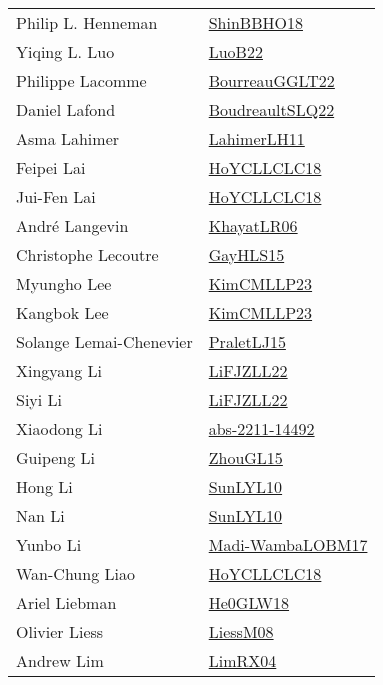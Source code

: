 {\begin{longtable}{p{4cm}p{20cm}}
Philip L. Henneman & \href{articles/ShinBBHO18.pdf}{ShinBBHO18}\cite{ShinBBHO18} \\
Yiqing L. Luo & \href{papers/LuoB22.pdf}{LuoB22}\cite{LuoB22} \\
Philippe Lacomme & \href{articles/BourreauGGLT22.pdf}{BourreauGGLT22}\cite{BourreauGGLT22} \\
Daniel Lafond & \href{papers/BoudreaultSLQ22.pdf}{BoudreaultSLQ22}\cite{BoudreaultSLQ22} \\
Asma Lahimer & \href{papers/LahimerLH11.pdf}{LahimerLH11}\cite{LahimerLH11} \\
Feipei Lai & \href{papers/HoYCLLCLC18.pdf}{HoYCLLCLC18}\cite{HoYCLLCLC18} \\
Jui{-}Fen Lai & \href{papers/HoYCLLCLC18.pdf}{HoYCLLCLC18}\cite{HoYCLLCLC18} \\
Andr{\'{e}} Langevin & \href{articles/KhayatLR06.pdf}{KhayatLR06}\cite{KhayatLR06} \\
Christophe Lecoutre & \href{papers/GayHLS15.pdf}{GayHLS15}\cite{GayHLS15} \\
Myungho Lee & \href{papers/KimCMLLP23.pdf}{KimCMLLP23}\cite{KimCMLLP23} \\
Kangbok Lee & \href{papers/KimCMLLP23.pdf}{KimCMLLP23}\cite{KimCMLLP23} \\
Solange Lemai{-}Chenevier & \href{papers/PraletLJ15.pdf}{PraletLJ15}\cite{PraletLJ15} \\
Xingyang Li & \href{papers/LiFJZLL22.pdf}{LiFJZLL22}\cite{LiFJZLL22} \\
Siyi Li & \href{papers/LiFJZLL22.pdf}{LiFJZLL22}\cite{LiFJZLL22} \\
Xiaodong Li & \href{articles/abs-2211-14492.pdf}{abs-2211-14492}\cite{abs-2211-14492} \\
Guipeng Li & \href{papers/ZhouGL15.pdf}{ZhouGL15}\cite{ZhouGL15} \\
Hong Li & \href{papers/SunLYL10.pdf}{SunLYL10}\cite{SunLYL10} \\
Nan Li & \href{papers/SunLYL10.pdf}{SunLYL10}\cite{SunLYL10} \\
Yunbo Li & \href{papers/Madi-WambaLOBM17.pdf}{Madi-WambaLOBM17}\cite{Madi-WambaLOBM17} \\
Wan{-}Chung Liao & \href{papers/HoYCLLCLC18.pdf}{HoYCLLCLC18}\cite{HoYCLLCLC18} \\
Ariel Liebman & \href{papers/He0GLW18.pdf}{He0GLW18}\cite{He0GLW18} \\
Olivier Liess & \href{articles/LiessM08.pdf}{LiessM08}\cite{LiessM08} \\
Andrew Lim & \href{papers/LimRX04.pdf}{LimRX04}\cite{LimRX04} \\

\end{longtable}}
